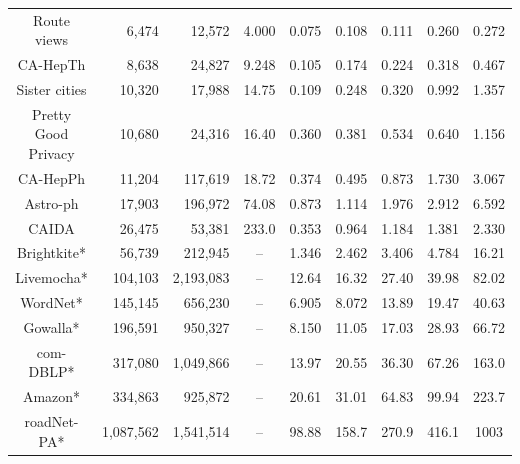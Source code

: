\documentclass[10pt,twocolumn,twoside]{IEEEtran}
\begin{document}
\begin{table}[htbp]
\begin{threeparttable}
\begin{tabular}{crrcccccc}
            Route views                                   & 6,474     & 12,572    & 4.000   & 0.075   & 0.108    & 0.111   & 0.260    & 0.272   \\
            CA-HepTh                                      & 8,638     & 24,827    & 9.248   & 0.105   & 0.174    & 0.224   & 0.318    & 0.467   \\
            Sister cities                                 & 10,320    & 17,988    & 14.75   & 0.109   & 0.248    & 0.320   & 0.992    & 1.357   \\
            Pretty Good Privacy                           & 10,680    & 24,316    & 16.40   & 0.360   & 0.381    & 0.534   & 0.640    & 1.156   \\
            CA-HepPh                                      & 11,204    & 117,619   & 18.72   & 0.374   & 0.495    & 0.873   & 1.730    & 3.067   \\
            Astro-ph                                      & 17,903    & 196,972   & 74.08   & 0.873   & 1.114    & 1.976   & 2.912    & 6.592   \\
            CAIDA                                         & 26,475    & 53,381    & 233.0   & 0.353   & 0.964    & 1.184   & 1.381    & 2.330   \\
            Brightkite*                                   & 56,739    & 212,945   & --      & 1.346   & 2.462    & 3.406   & 4.784    & 16.21   \\
            Livemocha*                                    & 104,103   & 2,193,083 & --      & 12.64   & 16.32    & 27.40   & 39.98    & 82.02   \\
            WordNet*                                      & 145,145   & 656,230   & --      & 6.905   & 8.072    & 13.89   & 19.47    & 40.63   \\
            Gowalla*                                      & 196,591   & 950,327   & --      & 8.150   & 11.05    & 17.03   & 28.93    & 66.72   \\
            com-DBLP*                                     & 317,080   & 1,049,866 & --      & 13.97   & 20.55    & 36.30   & 67.26    & 163.0   \\
            Amazon*                                       & 334,863   & 925,872   & --      & 20.61   & 31.01    & 64.83   & 99.94    & 223.7   \\
            roadNet-PA*                                   & 1,087,562 & 1,541,514 & --      & 98.88   & 158.7    & 270.9   & 416.1    & 1003    \\

\end{tabular}
\end{threeparttable}
\end{table}
\end{document}
